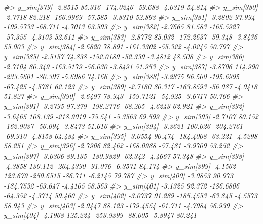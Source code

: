 \documentclass[
  10pt,
  italian,
  a4paper,
  extrafontsizes,onecolumn,openright
  ]{memoir}
\newenvironment{Shaded}{\begin{snugshade}}{\end{snugshade}}
\newcommand{\CommentTok}[1]{\textcolor[rgb]{0.56,0.35,0.01}{\textit{#1}}}
\begin{document}
\begin{Shaded}
\begin{Highlighting}[]
\CommentTok{\#\textgreater{}   y\_sim[379] {-}2.8515  85.316 {-}174.0246 {-}59.688 {-}4.0319 54.814}
\CommentTok{\#\textgreater{}   y\_sim[380] {-}2.7718  82.218 {-}166.9969 {-}57.585 {-}3.8310 52.893}
\CommentTok{\#\textgreater{}   y\_sim[381] {-}3.2802  97.994 {-}199.5733 {-}68.711 {-}4.7013 63.593}
\CommentTok{\#\textgreater{}   y\_sim[382] {-}2.7665  81.583 {-}165.5927 {-}57.355 {-}4.3103 52.611}
\CommentTok{\#\textgreater{}   y\_sim[383] {-}2.8772  85.032 {-}172.2637 {-}59.348 {-}3.8436 55.003}
\CommentTok{\#\textgreater{}   y\_sim[384] {-}2.6820  78.891 {-}161.3302 {-}55.322 {-}4.0245 50.797}
\CommentTok{\#\textgreater{}   y\_sim[385] {-}2.5157  74.838 {-}152.0189 {-}52.339 {-}3.4812 48.508}
\CommentTok{\#\textgreater{}   y\_sim[386] {-}2.7104  80.349 {-}163.5179 {-}56.030 {-}3.8491 51.953}
\CommentTok{\#\textgreater{}   y\_sim[387] {-}3.8706 114.990 {-}233.5601 {-}80.397 {-}5.6986 74.166}
\CommentTok{\#\textgreater{}   y\_sim[388] {-}3.2875  96.500 {-}195.6995 {-}67.425 {-}4.5781 62.123}
\CommentTok{\#\textgreater{}   y\_sim[389] {-}2.7180  80.317 {-}163.8593 {-}56.087 {-}4.0418 51.827}
\CommentTok{\#\textgreater{}   y\_sim[390] {-}2.6497  78.943 {-}159.7121 {-}54.925 {-}3.6717 50.766}
\CommentTok{\#\textgreater{}   y\_sim[391] {-}3.2795  97.379 {-}198.2776 {-}68.205 {-}4.6243 62.921}
\CommentTok{\#\textgreater{}   y\_sim[392] {-}3.6465 108.139 {-}218.9019 {-}75.541 {-}5.3563 69.599}
\CommentTok{\#\textgreater{}   y\_sim[393] {-}2.7107  80.152 {-}162.9037 {-}56.094 {-}3.8473 51.616}
\CommentTok{\#\textgreater{}   y\_sim[394] {-}3.3621 100.026 {-}204.2761 {-}69.910 {-}4.8158 64.484}
\CommentTok{\#\textgreater{}   y\_sim[395] {-}3.0554  90.474 {-}184.4008 {-}63.221 {-}4.5298 58.251}
\CommentTok{\#\textgreater{}   y\_sim[396] {-}2.7906  82.462 {-}168.0988 {-}57.481 {-}3.9709 53.252}
\CommentTok{\#\textgreater{}   y\_sim[397] {-}3.0306  89.135 {-}180.9829 {-}62.342 {-}4.4667 57.348}
\CommentTok{\#\textgreater{}   y\_sim[398] {-}4.3858 130.112 {-}264.4390 {-}91.076 {-}6.3571 84.174}
\CommentTok{\#\textgreater{}   y\_sim[399] {-}4.1562 123.679 {-}250.6515 {-}86.711 {-}6.2145 79.787}
\CommentTok{\#\textgreater{}   y\_sim[400] {-}3.0853  90.973 {-}184.7532 {-}63.647 {-}4.4105 58.563}
\CommentTok{\#\textgreater{}   y\_sim[401] {-}3.1325  92.372 {-}186.6806 {-}64.352 {-}4.3714 59.460}
\CommentTok{\#\textgreater{}   y\_sim[402] {-}3.0737  91.289 {-}185.4553 {-}63.845 {-}4.5573 58.943}
\CommentTok{\#\textgreater{}   y\_sim[403] {-}2.9447  88.123 {-}179.4554 {-}61.711 {-}4.7984 56.939}
\CommentTok{\#\textgreater{}   y\_sim[404] {-}4.1968 125.224 {-}253.9399 {-}88.005 {-}5.8947 80.241}

\end{Highlighting}
\end{Shaded}
\end{document}
